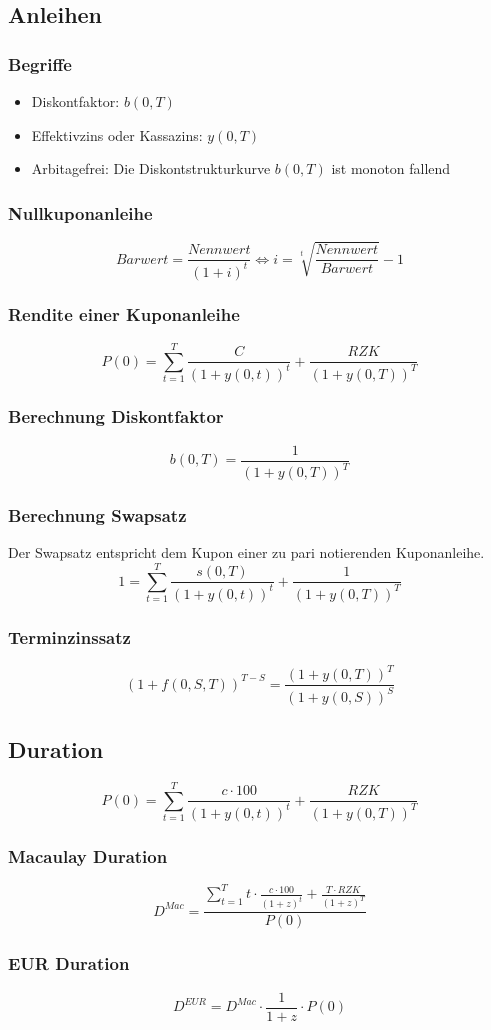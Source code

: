 \subsection{Anleihen}

\subsubsection{Begriffe}
\begin{itemize}
	\item Diskontfaktor: \(b(0,T)\)
	\item Effektivzins oder Kassazins: \(y(0,T)\)
	\item Arbitagefrei: Die Diskontstrukturkurve \(b(0,T)\) ist monoton fallend
\end{itemize}

\subsubsection{Nullkuponanleihe}
\[Barwert = \frac{Nennwert}{(1+i)^t} \iff i = \sqrt[t]{\frac{Nennwert}{Barwert}} -1\]

\subsubsection{Rendite einer Kuponanleihe}
\[P(0) = \sum_{t=1}^{T} \frac{C}{(1+y(0,t))^t} + \frac{RZK}{(1+y(0,T))^T}\]

\subsubsection{Berechnung Diskontfaktor}
\[b(0,T) = \frac{1}{(1+y(0,T))^T}\]

\subsubsection{Berechnung Swapsatz}
Der Swapsatz entspricht dem Kupon einer zu pari notierenden Kuponanleihe.
\[1 = \sum_{t=1}^{T} \frac{s(0,T)}{(1+y(0,t))^t} + \frac{1}{(1+y(0,T))^T}\]

\subsubsection{Terminzinssatz}
\[(1+f(0,S,T))^{T-S} = \frac{(1+y(0,T))^T}{(1+y(0,S))^S}\]


\subsection{Duration}
\[P(0) = \sum_{t=1}^{T} \frac{c \cdot 100}{(1+y(0,t))^t} + \frac{RZK}{(1+y(0,T))^T}\]

\subsubsection{Macaulay Duration}
\[D^{Mac} = \frac{\sum_{t=1}^{T} t \cdot \frac{c \cdot 100}{(1+z)^t} + \frac{T \cdot RZK}{(1+z)^T}}{P(0)} \]

\subsubsection{EUR Duration}
\[D^{EUR} = D^{Mac} \cdot \frac{1}{1+z} \cdot P(0) \]

